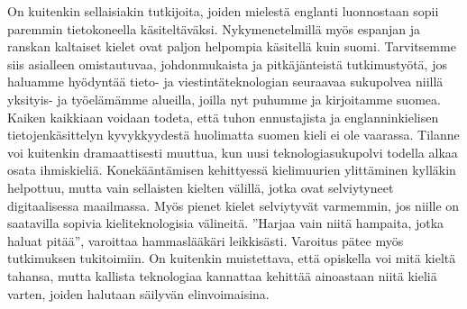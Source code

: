 \begin{multicols}{2}
On kuitenkin sellaisiakin tutkijoita, joiden mielestä englanti luonnostaan sopii paremmin tietokoneella käsiteltäväksi. Nykymenetelmillä myös espanjan ja ranskan kaltaiset kielet ovat paljon helpompia käsitellä kuin suomi. Tarvitsemme siis asialleen omistautuvaa, johdonmukaista ja pitkäjänteistä tutkimustyötä, jos haluamme hyödyntää tieto- ja viestintäteknologian seuraavaa sukupolvea niillä yksityis- ja työelämämme alueilla, joilla nyt puhumme ja kirjoitamme suomea.
Kaiken kaikkiaan voidaan todeta, että tuhon ennustajista ja englanninkielisen tietojenkäsittelyn kyvykkyydestä huolimatta suomen kieli ei ole vaarassa. Tilanne voi kuitenkin dramaattisesti muuttua, kun uusi teknologiasukupolvi todella alkaa osata ihmiskieliä. Konekääntämisen kehittyessä kielimuurien ylittäminen kylläkin helpottuu, mutta vain sellaisten kielten välillä, jotka ovat selviytyneet digitaalisessa maailmassa. Myös pienet kielet selviytyvät varmemmin, jos niille on saatavilla sopivia kieliteknologisia välineitä.
”Harjaa vain niitä hampaita, jotka haluat pitää”, varoittaa hammaslääkäri leikkisästi. Varoitus pätee myös tutkimuksen tukitoimiin. On kuitenkin muistettava, että opiskella voi mitä kieltä tahansa, mutta kallista teknologiaa kannattaa kehittää ainoastaan niitä kieliä varten, joiden halutaan säilyvän elinvoimaisina.



\end{multicols}
